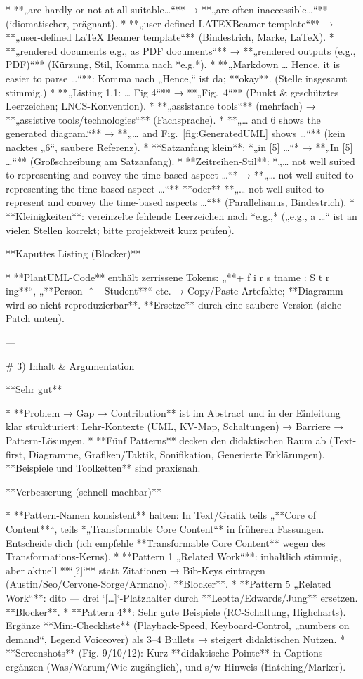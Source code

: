 * **„are hardly or not at all suitable…“** → **„are often inaccessible…“** (idiomatischer, prägnant). 
* **„user defined LATEXBeamer template“** → **„user-defined \LaTeX{} Beamer template“** (Bindestrich, Marke, \LaTeX). 
* **„rendered documents e.g., as PDF documents“** → **„rendered outputs (e.g., PDF)“** (Kürzung, Stil, Komma nach *e.g.*). 
* **„Markdown … Hence, it is easier to parse …“**: Komma nach „Hence,“ ist da; **okay**. (Stelle insgesamt stimmig.) 
* **„Listing 1.1: … Fig 4“** → **„Fig.~4“** (Punkt & geschütztes Leerzeichen; LNCS-Konvention). 
* **„assistance tools“** (mehrfach) → **„assistive tools/technologies“** (Fachsprache). 
* **„… and 6 shows the generated diagram.“** → **„… and Fig.~\ref{fig:GeneratedUML} shows …“** (kein nacktes „6“, saubere Referenz). 
* **Satzanfang klein**: *„in [5] …“* → **„In [5] …“** (Großschreibung am Satzanfang). 
* **Zeitreihen-Stil**: *„… not well suited to representing and convey the time based aspect …“* →
  **„… not well suited to representing the time-based aspect …“** **oder**
  **„… not well suited to represent and convey the time-based aspects …“** (Parallelismus, Bindestrich). 
* **Kleinigkeiten**: vereinzelte fehlende Leerzeichen nach *e.g.,* („e.g., a …“ ist an vielen Stellen korrekt; bitte projektweit kurz prüfen). 

**Kaputtes Listing (Blocker)**

* **PlantUML-Code** enthält zerrissene Tokens: „**+ f i r s tname : S t r ing**“, „**Person −̂− Student**“ etc. → Copy/Paste-Artefakte; **Diagramm wird so nicht reproduzierbar**. **Ersetze** durch eine saubere Version (siehe Patch unten). 

---

# 3) Inhalt & Argumentation

**Sehr gut**

* **Problem → Gap → Contribution** ist im Abstract und in der Einleitung klar strukturiert: Lehr-Kontexte (UML, KV-Map, Schaltungen) → Barriere → Pattern-Lösungen. 
* **Fünf Patterns** decken den didaktischen Raum ab (Text-first, Diagramme, Grafiken/Taktik, Sonifikation, Generierte Erklärungen). **Beispiele und Toolketten** sind praxisnah. 

**Verbesserung (schnell machbar)**

* **Pattern-Namen konsistent** halten: In Text/Grafik teils „**Core of Content**“, teils *„Transformable Core Content“* in früheren Fassungen. Entscheide dich (ich empfehle **Transformable Core Content** wegen des Transformations-Kerns). 
* **Pattern 1 „Related Work“**: inhaltlich stimmig, aber aktuell **`[?]`** statt Zitationen → Bib-Keys eintragen (Austin/Seo/Cervone-Sorge/Armano). **Blocker**. 
* **Pattern 5 „Related Work“**: dito — drei `[…]`-Platzhalter durch **Leotta/Edwards/Jung** ersetzen. **Blocker**. 
* **Pattern 4**: Sehr gute Beispiele (RC-Schaltung, Highcharts). Ergänze **Mini-Checkliste** (Playback-Speed, Keyboard-Control, „numbers on demand“, Legend Voiceover) als 3–4 Bullets → steigert didaktischen Nutzen. 
* **Screenshots** (Fig. 9/10/12): Kurz **didaktische Pointe** in Captions ergänzen (Was/Warum/Wie-zugänglich), und s/w-Hinweis (Hatching/Marker). 

